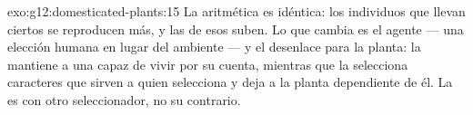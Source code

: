 \begin{solution}{exo:g12:domesticated-plants:15}
La aritmética es idéntica: los individuos que llevan ciertos  se
reproducen más, y las  de esos  suben. Lo que cambia
es el agente --- una elección humana en lugar del ambiente --- y el
desenlace para la planta: la  mantiene a una 
capaz de vivir por su cuenta, mientras que la  selecciona
caracteres que sirven a quien selecciona y deja a la planta dependiente
de él. La  es  con otro seleccionador, no
su contrario.
\end{solution}

